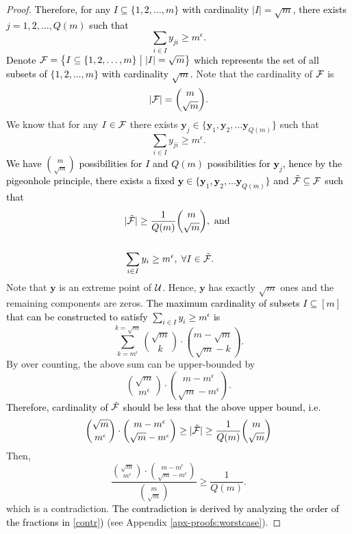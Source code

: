 \documentclass[11pt]{article}
\theoremstyle{plain}
\theoremstyle{definition}
\numberwithin{equation}{section}%
\numberwithin{equation}{section}%
\newcommand{\mb}[1]{\ensuremath{\boldsymbol{#1}}}
\newcommand*{\red}{\textcolor{black}}
\begin{document}
\begin{proof}
\red{ Therefore, for any $ I \subseteq \{1,2,\ldots,m\}$ with cardinality $ \vert I \vert = \sqrt{m}$, there exists $j=1,2,\ldots, Q(m)$ such that
$$ \sum_{i \in I}  {y_{ji}} \geq m^{\epsilon}.$$
}
\red{Denote ${\cal F} = \left\{  I \subseteq \{1,2,\ldots,m\} \; \big\vert \; \vert I \vert=\sqrt{m} \right\}$ which represents the set of all subsets of $\{1,2,\ldots,m\}$ with cardinality $\sqrt{m}$.} Note that the cardinality of $\cal F$ is
$$ \vert {\cal F} \vert = \binom{m}{\sqrt{m}} .$$
We know that for any $ I \in {\cal F} $ there exists $\mb y _j \in \{ \mb{y}_1,\mb{y}_2,\ldots\mb{y}_{Q(m)} \} $ such that
\[ \sum_{i \in I}  {y_{ji}} \geq m^{\epsilon}.\]
\red{ We have $\binom{m}{\sqrt{m}}$ possibilities for $I$ and $Q(m)$ possibilities for $\mb y_j$, hence by the pigeonhole principle, there exists a fixed $\mb y \in \{ \mb{y}_1,\mb{y}_2,\ldots\mb{y}_{Q(m)} \} $ and $ \tilde{\cal F} \subseteq {\cal F} $ such that  }
\begin{equation}\label{cond}
\begin{aligned}
& \vert \tilde{\cal F} \vert  \geq \frac{1}{Q(m)} \binom{m}{\sqrt{m}}, \mbox{ and } \\
& \\
& \sum_{i \in I}  {y_{i}}  \geq m^{\epsilon}, \; \forall I \in \tilde{\cal F}.
\end{aligned}
\end{equation}
Note that $\mb y$ is an extreme point of $ \cal U$. Hence, $\mb y$ has exactly $ \sqrt{m}$ ones and the remaining components are zeros. \red{The maximum cardinality of subsets $I \subseteq [m]$ that can be constructed to satisfy $\sum_{i \in I}  {y_{i}}  \geq m^{\epsilon}$ is}
$$ \sum_{k=m^{\epsilon}}^{k=\sqrt{m}} \binom{\sqrt{m}}{k} \cdot \binom{m-\sqrt{m}}{\sqrt{m}-k} .$$
By over counting, the above sum can be upper-bounded by
$$ \binom{\sqrt{m}}{m^{\epsilon}} \cdot \binom{m-m^{\epsilon}}{\sqrt{m}-m^{\epsilon}}.$$
\red{Therefore, cardinality of $\tilde{\cal F}$ should be less that the above upper bound, i.e.}
$$\binom{\sqrt{m}}{m^{\epsilon}} \cdot \binom{m-m^{\epsilon}}{\sqrt{m}-m^{\epsilon}} \geq  \vert \tilde{\cal F} \vert \geq \frac{1}{Q(m)} \binom{m}{\sqrt{m}} $$
Then,
\begin{equation}\label{contr}
\frac{\binom{\sqrt{m}}{m^{\epsilon}} \cdot \binom{m-m^{\epsilon}}{\sqrt{m}-m^{\epsilon}} }{\binom{m}{\sqrt{m}}} \geq \frac{1}{Q(m)}.
\end{equation}
 which is a contradiction. \red{The contradiction is derived by analyzing the order of the fractions in \eqref{contr})} (see Appendix \ref{apx-proofs:worstcase}).  \end {proof}
\end{document}
